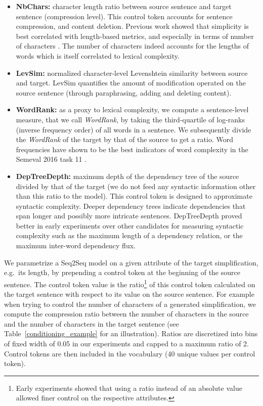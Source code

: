 \documentclass[10pt, a4paper]{article}
\begin{document}
\begin{itemize}
    \item
{\bf NbChars:} character length ratio between source sentence and target sentence (compression level). This control token accounts for sentence compression, and content deletion.
Previous work showed that simplicity is best correlated with length-based metrics, and especially in terms of number of characters \cite{martin2019reference}. The number of characters indeed accounts for the lengths of words which is itself correlated to lexical complexity.
    \item 
{\bf LevSim:} normalized character-level Levenshtein similarity \cite{levenshtein1966binary} between source and target. LevSim quantifies the amount of modification operated on the source sentence (through paraphrasing, adding and deleting content).
    \item 
{\bf WordRank:} as a proxy to lexical complexity, we compute a sentence-level measure, that we call \mbox{\textit{WordRank}}, by taking the third-quartile of log-ranks (inverse frequency order) of all words in a sentence.  We subsequently divide the \mbox{\textit{WordRank}} of the target by that of the source to get a ratio.
Word frequencies have shown to be the best indicators of word complexity in the Semeval 2016 task 11 \cite{paetzold2016semeval}.
    \item 
{\bf DepTreeDepth:} maximum depth of the dependency tree of the source divided by that of the target (we do not feed any syntactic information other than this ratio to the model). This control token is designed to approximate syntactic complexity. Deeper dependency trees indicate dependencies that span longer and possibly more intricate sentences. DepTreeDepth proved better in early experiments over other candidates for measuring syntactic complexity such as the maximum length of a dependency relation, or the maximum inter-word dependency flux.
\end{itemize}

We parametrize a Seq2Seq model on a given attribute of the target simplification, e.g.~its length, by prepending a control token at the beginning of the source sentence.
The control token value is the ratio\footnote{Early experiments showed that using a ratio instead of an absolute value allowed finer control on the respective attributes.}
of this control token calculated on the target sentence with respect to its value on the source sentence.
For example when trying to control the number of characters of a generated simplification, we compute the compression ratio between the number of characters in the source and the number of characters in the target sentence (see Table~\ref{conditioning_example} for an illustration). Ratios are discretized into bins of fixed width of 0.05 in our experiments and capped to a maximum ratio of 2. Control tokens are then included in the vocabulary (40 unique values per control token).
\end{document}
